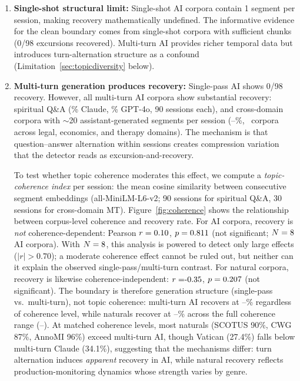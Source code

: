 \documentclass[final]{clv2025}
\begin{document}
\begin{enumerate}

\item \textbf{Single-shot structural limit:} Single-shot AI corpora contain 1 segment per session, making recovery mathematically undefined. The informative evidence for the clean boundary comes from single-shot corpora with sufficient chunks (0/98 excursions recovered). Multi-turn AI provides richer temporal data but introduces turn-alternation structure as a confound (Limitation~\ref{sec:topicdiversity} below).

\item \textbf{Multi-turn generation produces recovery:} \label{sec:topicdiversity} Single-pass AI shows 0/98 recovery. However, all multi-turn AI corpora show substantial recovery: spiritual Q\&A (\recClaudeMT\% Claude, \recGPTMT\% GPT-4o, 90 sessions each), and cross-domain corpora with $\sim$20 assistant-generated segments per session (\recMTXdomMin--\recMTXdomMax\%, \nMTXdom\ corpora across legal, economics, and therapy domains). The mechanism is that question--answer alternation within sessions creates compression variation that the detector reads as excursion-and-recovery.

\label{sec:coherence-limitation} To test whether topic coherence moderates this effect, we compute a \textit{topic-coherence index} per session: the mean cosine similarity between consecutive segment embeddings (all-MiniLM-L6-v2; 90 sessions for spiritual Q\&A, 30 sessions for cross-domain MT). Figure~\ref{fig:coherence} shows the relationship between corpus-level coherence and recovery rate. For AI corpora, recovery is \textit{not} coherence-dependent: Pearson $r = 0.10$, $p = 0.811{}$ (not significant; $N = 8$ AI corpora). With $N = 8$, this analysis is powered to detect only large effects ($|r| > 0.70$); a moderate coherence effect cannot be ruled out, but neither can it explain the observed single-pass/multi-turn contrast. For natural corpora, recovery is likewise coherence-independent: $r = \cohNatr$, $p = 0.207$ (not significant). The boundary is therefore generation structure (single-pass vs.\ multi-turn), not topic coherence: multi-turn AI recovers at \recClaudeMT--\recGPTMT\% regardless of coherence level, while naturals recover at \recNatMin--\recNatMax\% across the full coherence range (\cohNatMin--\cohNatMax). At matched coherence levels, most naturals (SCOTUS 90\%, CWG 87\%, AnnoMI 96\%) exceed multi-turn AI, though Vatican (27.4\%) falls below multi-turn Claude (34.1\%), suggesting that the mechanisms differ: turn alternation induces \textit{apparent} recovery in AI, while natural recovery reflects production-monitoring dynamics whose strength varies by genre.


\end{enumerate}
\end{document}
